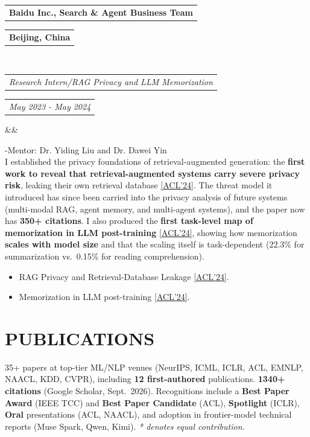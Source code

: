 \documentclass[11pt,a4paper,roman]{moderncv}        %
\makeatletter
\newcommand*{\customcventry}[7][.25em]{
  \begin{tabular}{@{}l} 
    {\bfseries #4}
  \end{tabular}
  \hfill%
  \begin{tabular}{l@{}}
     {\bfseries #5}
  \end{tabular} \\
  \begin{tabular}{@{}l} 
    {\itshape #3}
  \end{tabular}
  \hfill%
  \begin{tabular}{l@{}}
     {\itshape #2}
  \end{tabular}
  \ifx&#7&%
  \else{\\%
    \begin{minipage}{\maincolumnwidth}%
      \small#7%
    \end{minipage}}\fi%
  \par\addvspace{#1}}
\makeatother
\begin{document}
{\customcventry{May 2023 - May 2024}{Research Intern/RAG Privacy and LLM Memorization}{Baidu Inc., Search \& Agent Business Team}{Beijing, China}{}{}
-Mentor: Dr. Yiding Liu and Dr. Dawei Yin
\\[0.4em]
I established the privacy foundations of retrieval-augmented generation: the \textbf{first work to reveal that retrieval-augmented systems carry severe privacy risk}, leaking their own retrieval database \href{https://arxiv.org/abs/2402.16893}{[ACL'24]}. The threat model it introduced has since been carried into the privacy analysis of future systems (multi-modal RAG, agent memory, and multi-agent systems), and the paper now has \textbf{350+ citations}. I also produced the \textbf{first task-level map of memorization in LLM post-training} \href{https://arxiv.org/abs/2310.06714}{[ACL'24]}, showing how memorization \textbf{scales with model size} and that the scaling itself is task-dependent (22.3\% for summarization vs.\ 0.15\% for reading comprehension).
\begin{itemize}
    \item RAG Privacy and Retrieval-Database Leakage \href{https://arxiv.org/abs/2402.16893}{[ACL'24]}.
    \item Memorization in LLM post-training \href{https://arxiv.org/abs/2310.06714}{[ACL'24]}.
\end{itemize}
}



\section{PUBLICATIONS}
35+ papers at top-tier ML/NLP venues (NeurIPS, ICML, ICLR, ACL, EMNLP, NAACL, KDD, CVPR), including \textbf{12 first-authored} publications. \textbf{1340+ citations} (Google Scholar, Sept.\ 2026). Recognitions include a \textbf{Best Paper Award} (IEEE TCC) and \textbf{Best Paper Candidate} (ACL), \textbf{Spotlight} (ICLR), \textbf{Oral} presentations (ACL, NAACL), and adoption in frontier-model technical reports (Muse Spark, Qwen, Kimi). \textit{* denotes equal contribution.}
\end{document}
